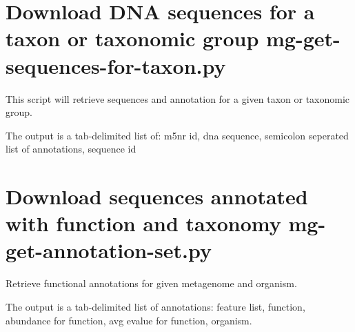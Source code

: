 \documentclass[letterpaper,10pt,english]{sphinxmanual}
\begin{document}
\section{Download DNA sequences for a taxon or taxonomic group\textendash{} mg-get-sequences-for-taxon.py}
\label{\detokenize{api:download-dna-sequences-for-a-taxon-or-taxonomic-group-mg-get-sequences-for-taxon-py}}
This script will retrieve sequences and annotation for a given taxon or
taxonomic group.

The output is a tab-delimited list of: m5nr id, dna sequence, semicolon
seperated list of annotations, sequence id


\begin{sphinxVerbatim}[commandchars=\\\{\}]
          
\end{sphinxVerbatim}


\section{Download sequences annotated with function and taxonomy \textendash{} mg-get-annotation-set.py}
\label{\detokenize{api:download-sequences-annotated-with-function-and-taxonomy-mg-get-annotation-set-py}}
Retrieve functional annotations for given metagenome and organism.

The output is a tab-delimited list of annotations: feature list,
function, abundance for function, avg evalue for function, organism.


\begin{sphinxVerbatim}[commandchars=\\\{\}]
        
\end{sphinxVerbatim}
\end{document}
